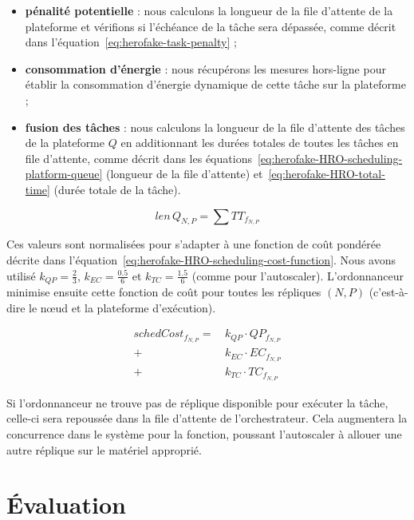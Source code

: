 \begin{itemize}
    \item \textbf{pénalité potentielle} : nous calculons la longueur de la file d'attente de la plateforme et vérifions si l'échéance de la tâche sera dépassée, comme décrit dans l'équation~\ref{eq:herofake-task-penalty} ;
    \item \textbf{consommation d'énergie} : nous récupérons les mesures hors-ligne pour établir la consommation d'énergie dynamique de cette tâche sur la plateforme ;
    \item \textbf{fusion des tâches} : nous calculons la longueur de la file d'attente des tâches de la plateforme $Q$ en additionnant les durées totales de toutes les tâches en file d'attente, comme décrit dans les équations~\ref{eq:herofake-HRO-scheduling-platform-queue} (longueur de la file d'attente) et~\ref{eq:herofake-HRO-total-time} (durée totale de la tâche). 
\end{itemize}

\begin{equation}
    len \, Q_{N, P} = \sum TT_{f_{N, P}}
\label{eq:herofake-HRO-scheduling-platform-queue}
\end{equation}

Ces valeurs sont normalisées pour s'adapter à une fonction de coût pondérée décrite dans l'équation~\ref{eq:herofake-HRO-scheduling-cost-function}. Nous avons utilisé $k_{QP} = \frac{2}{3}$, $k_{EC} = \frac{0.5}{6}$ et $k_{TC} = \frac{1.5}{6}$ (comme pour l'autoscaler). L'ordonnanceur minimise ensuite cette fonction de coût pour toutes les répliques $(N, P)$ (c'est-à-dire le nœud et la plateforme d'exécution).

\begin{equation}
\begin{split}
    schedCost_{{f}_{N, P}} = \, &k_{QP} \cdot QP_{{f}_{N, P}} \\
    + &k_{EC} \cdot {EC}_{{f}_{N, P}} \\
    + &k_{TC} \cdot TC_{{f}_{N, P}}
\end{split}
\label{eq:herofake-HRO-scheduling-cost-function}
\end{equation}

Si l'ordonnanceur ne trouve pas de réplique disponible pour exécuter la tâche, celle-ci sera repoussée dans la file d'attente de l'orchestrateur. Cela augmentera la concurrence dans le système pour la fonction, poussant l'autoscaler à allouer une autre réplique sur le matériel approprié.

\section{Évaluation}
\label{section:herofake-evaluation}

